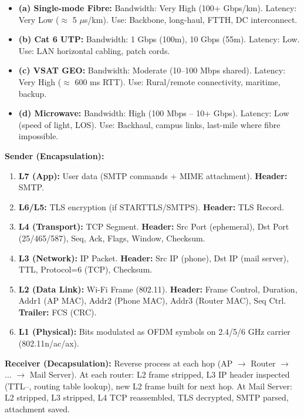 \documentclass[11pt]{article}
\begin{document}
\begin{corrige}[Exercise 3]
\begin{itemize}
    \item \textbf{(a) Single-mode Fibre:} Bandwidth: Very High (100+ Gbps/km). Latency: Very Low ($\approx$ 5 $\mu$s/km). Use: Backbone, long-haul, FTTH, DC interconnect.
    \item \textbf{(b) Cat 6 UTP:} Bandwidth: 1 Gbps (100m), 10 Gbps (55m). Latency: Low. Use: LAN horizontal cabling, patch cords.
    \item \textbf{(c) VSAT GEO:} Bandwidth: Moderate (10--100 Mbps shared). Latency: Very High ($\approx$ 600 ms RTT). Use: Rural/remote connectivity, maritime, backup.
    \item \textbf{(d) Microwave:} Bandwidth: High (100 Mbps -- 10+ Gbps). Latency: Low (speed of light, LOS). Use: Backhaul, campus links, last-mile where fibre impossible.
\end{itemize}
\end{corrige}

\begin{corrige}[Exercise 4]
\textbf{Sender (Encapsulation):}
\begin{enumerate}
    \item \textbf{L7 (App):} User data (SMTP commands + MIME attachment). \textbf{Header:} SMTP.
    \item \textbf{L6/L5:} TLS encryption (if STARTTLS/SMTPS). \textbf{Header:} TLS Record.
    \item \textbf{L4 (Transport):} TCP Segment. \textbf{Header:} Src Port (ephemeral), Dst Port (25/465/587), Seq, Ack, Flags, Window, Checksum.
    \item \textbf{L3 (Network):} IP Packet. \textbf{Header:} Src IP (phone), Dst IP (mail server), TTL, Protocol=6 (TCP), Checksum.
    \item \textbf{L2 (Data Link):} Wi-Fi Frame (802.11). \textbf{Header:} Frame Control, Duration, Addr1 (AP MAC), Addr2 (Phone MAC), Addr3 (Router MAC), Seq Ctrl. \textbf{Trailer:} FCS (CRC).
    \item \textbf{L1 (Physical):} Bits modulated as OFDM symbols on 2.4/5/6 GHz carrier (802.11n/ac/ax).
\end{enumerate}
\textbf{Receiver (Decapsulation):} Reverse process at each hop (AP $\to$ Router $\to$ ... $\to$ Mail Server). At each router: L2 frame stripped, L3 IP header inspected (TTL--, routing table lookup), new L2 frame built for next hop. At Mail Server: L2 stripped, L3 stripped, L4 TCP reassembled, TLS decrypted, SMTP parsed, attachment saved.
\end{corrige}
\end{document}
